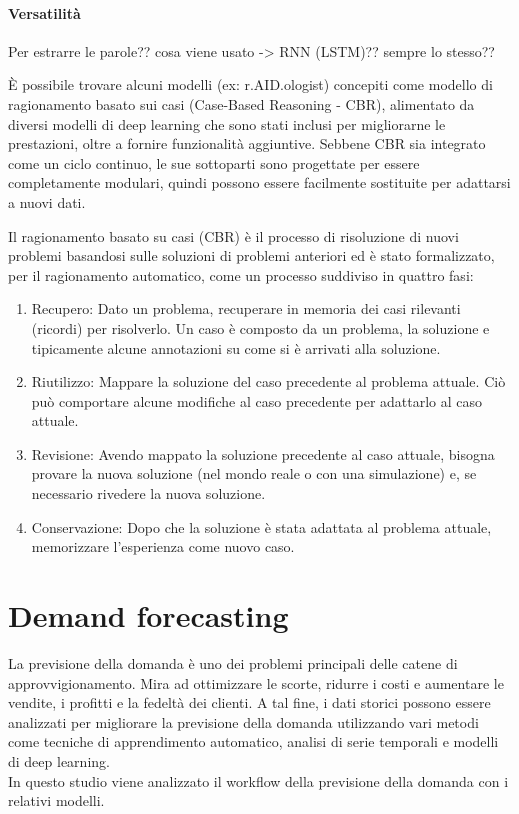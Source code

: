 \documentclass[12pt,a4paper]{report}
\begin{document}
\subsubsection{Versatilità}
Per estrarre le parole?? cosa viene usato -> RNN (LSTM)?? sempre lo stesso??

È possibile trovare alcuni modelli (ex: r.AID.ologist) concepiti come modello di ragionamento basato sui casi (Case-Based Reasoning - CBR), alimentato da diversi modelli di deep learning che sono stati inclusi per migliorarne le prestazioni, oltre a fornire funzionalità aggiuntive.
Sebbene CBR sia integrato come un ciclo continuo, le sue sottoparti sono progettate per essere completamente modulari, quindi possono essere facilmente sostituite per adattarsi a nuovi dati.

Il ragionamento basato su casi (CBR) è il processo di risoluzione di nuovi problemi basandosi sulle soluzioni di problemi anteriori ed è stato formalizzato, per il ragionamento automatico, come un processo suddiviso in quattro fasi:
\begin{enumerate}
\item Recupero: Dato un problema, recuperare in memoria dei casi rilevanti (ricordi) per risolverlo. Un caso è composto da un problema, la soluzione e tipicamente alcune annotazioni su come si è arrivati alla soluzione.
\item Riutilizzo: Mappare la soluzione del caso precedente al problema attuale. Ciò può comportare alcune modifiche al caso precedente per adattarlo al caso attuale.
\item Revisione: Avendo mappato la soluzione precedente al caso attuale, bisogna provare la nuova soluzione (nel mondo reale o con una simulazione) e, se necessario rivedere la nuova soluzione.
\item Conservazione: Dopo che la soluzione è stata adattata al problema attuale, memorizzare l'esperienza come nuovo caso.
\end{enumerate}

\chapter{Demand forecasting}
La previsione della domanda è uno dei problemi principali delle catene di approvvigionamento. Mira ad ottimizzare le scorte, ridurre i costi e aumentare le vendite, i profitti e la fedeltà dei clienti. A tal fine, i dati storici possono essere analizzati per migliorare la previsione della domanda utilizzando vari metodi come tecniche di apprendimento automatico, analisi di serie temporali e modelli di deep learning.\\
In questo studio viene analizzato il workflow della previsione della domanda con i relativi modelli. 
\end{document}
